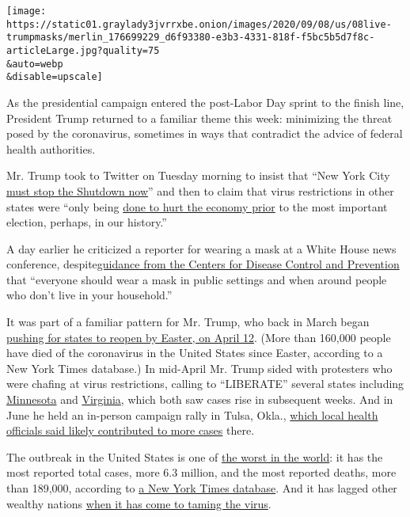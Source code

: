 \texttt{[image: https://static01.graylady3jvrrxbe.onion/images/2020/09/08/us/08live-trumpmasks/merlin\_176699229\_d6f93380-e3b3-4331-818f-f5bc5b5d7f8c-articleLarge.jpg?quality=75\\\&auto=webp\\\&disable=upscale]}

As the presidential campaign entered the post-Labor Day sprint to the
finish line, President Trump returned to a familiar theme this week:
minimizing the threat posed by the coronavirus, sometimes in ways that
contradict the advice of federal health authorities.

Mr. Trump took to Twitter on Tuesday morning to insist that ``New York
City
\href{https://twitter.com/realDonaldTrump/status/1303305303249870854?s=20}{must
stop the Shutdown now}'' and then to claim that virus restrictions in
other states were ``only being
\href{https://twitter.com/realDonaldTrump/status/1303313054281666584?s=20}{done
to hurt the economy prior} to the most important election, perhaps, in
our history.''

A day earlier he criticized a reporter for wearing a mask at a White
House news conference,
despite\href{https://www.cdc.gov/coronavirus/2019-ncov/prevent-getting-sick/prevention.html}{guidance
from the Centers for Disease Control and Prevention} that ``everyone
should wear a mask in public settings and when around people who don't
live in your household.''

It was part of a familiar pattern for Mr. Trump, who back in March began
\href{https://www.nytimes3xbfgragh.onion/2020/03/24/us/politics/trump-coronavirus-easter.html}{pushing
for states to reopen by Easter, on April 12}. (More than 160,000 people
have died of the coronavirus in the United States since Easter,
according to a New York Times database.) In mid-April Mr. Trump sided
with protesters who were chafing at virus restrictions, calling to
``LIBERATE'' several states including
\href{https://twitter.com/realDonaldTrump/status/1251168994066944003}{Minnesota}
and
\href{https://twitter.com/realDonaldTrump/status/1251169987110330372}{Virginia},
which both saw cases rise in subsequent weeks. And in June he held an
in-person campaign rally in Tulsa, Okla.,
\href{https://www.nytimes3xbfgragh.onion/2020/07/08/us/politics/coronavirus-tulsa-trump-rally.html}{which
local health officials said likely contributed to more cases} there.

The outbreak in the United States is one of
\href{https://www.nytimes3xbfgragh.onion/interactive/2020/world/coronavirus-maps.html}{the
worst in the world}: it has the most reported total cases, more 6.3
million, and the most reported deaths, more than 189,000, according to
\href{https://www.nytimes3xbfgragh.onion/interactive/2020/us/coronavirus-us-cases.html}{a
New York Times database}. And it has lagged other wealthy nations
\href{https://www.nytimes3xbfgragh.onion/2020/08/06/us/coronavirus-us.html}{when
it has come to taming the virus}.

